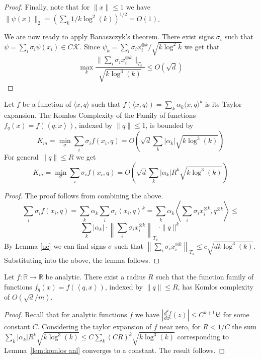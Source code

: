 \documentclass[anon,12pt]{colt2019} %
\newcommand{\ip}[1]{\left \langle #1 \right \rangle}
\newcommand{\R}{\mathbb{R}}
\begin{document}
\begin{proof}
Finally, note that for $\|x\| \le 1$ we have $\|\psi(x)\|_2 = (\sum_k  1/k\log^2(k))^{1/2} = O(1)$.


We are now ready to apply Banaszczyk's theorem. 
There exist signs $\sigma_i$ such that $\psi  = \sum_i \sigma_i \psi(x_i) \in C \mathcal K$.
Since $\psi_k = \sum_i \sigma_i x_i^{\otimes k}/\sqrt{k \log^2{k}}$ we get that 
$$\max_k \frac{\|\sum_i \sigma_i  x_i^{\otimes k}\|_{T_k}}{\sqrt{k \log^{3}(k)}} \le O\left( \sqrt{d} \right)$$
\end{proof}

\begin{lemma} \label{lem:komlos anl}
Let $f$ be a function of $\langle x,q\rangle$ such that $f(\langle x,q\rangle) = \sum_k \alpha_k \langle x,q\rangle^k$ is its Taylor expansion. The Komlos Complexity of the Family of functions $f_q(x) = f(\ip{q,x})$, indexed by $\|q\| \leq 1$, is bounded by
\[
K_m = \min_\sigma \sum_i \sigma_i f(x_i,q) =O\left( \sqrt{d} \sum_k  |\alpha_k|\sqrt{k\log^3(k)}\right)
\]
For general $\|q\| \leq R$ we get
\[
K_m = \min_\sigma \sum_i \sigma_i f(x_i,q) =O\left( \sqrt{d} \sum_k  |\alpha_k| R^k \sqrt{ k\log^3(k)}\right)
\]
\end{lemma}
\begin{proof}
The proof follows from combining the above.
$$
\sum_i \sigma_i f(x_i,q) = \sum_k \alpha_k \sum_i \sigma_i \ip{ x_i,q}^k =  \sum_k \alpha_k  \ip{  \sum_i \sigma_i x_i^{\otimes k},q^{\otimes k}} \le $$
$$\sum_k |\alpha_k| \cdot \left\| \sum_i \sigma_i x_i^{\otimes k}\right\|_{T_k} \cdot \|q\|^k
$$
By Lemma \ref{uc} we can find signs $\sigma$ such that 
$\left\| \sum_i \sigma_i x_i^{\otimes k}\right\|_{T_k} \le c\sqrt{d k \log^3(k)}$. Substituting into the above, the lemma follows.
\end{proof}

\begin{theorem}\label{analitic1}
Let $f:\R\rightarrow\R$ be analytic. There exist a radius $R$ such that the function family of functions $f_q(x) = f(\ip{q,x})$, indexed by $\|q\| \leq R$, has Komlos complexity of $O(\sqrt{d}/m)$. 
\end{theorem}
\begin{proof}
Recall that for analytic functions $f$ we have $\left| \frac{d^k f}{dz^k}(z) \right|  \leq C^{k+1} k! $
for some constant $C$. Considering the taylor expansion of $f$ near zero, for $R < 1/C$ the sum
$ \sum_k  |\alpha_k| R^k \sqrt{ k\log^3(k)} \leq C \sum_k  (CR)^k \sqrt{ k\log^3(k)}$
corresponding to Lemma~\ref{lem:komlos anl} converges to a constant. The result follows.
\end{proof}
\end{document}

